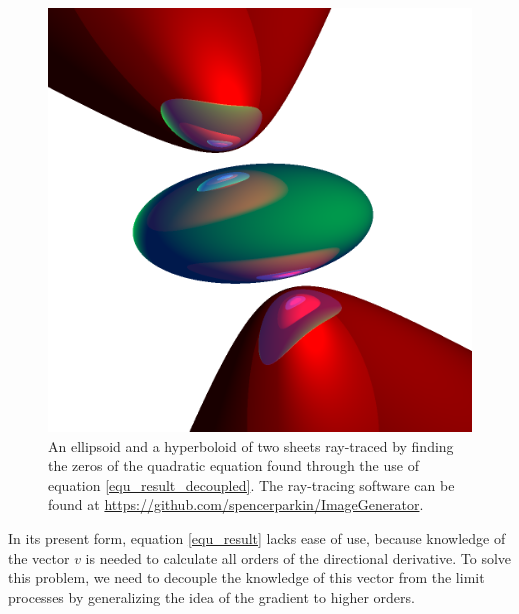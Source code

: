 \documentclass{birkjour}
\theoremstyle{definition}
\theoremstyle{remark}
\numberwithin{equation}{section}
\begin{document}
\begin{figure}
\includegraphics[scale=0.3]{Quadrics}
\caption{An ellipsoid and a hyperboloid of two sheets ray-traced by finding the zeros
of the quadratic equation found through the use of equation \eqref{equ_result_decoupled}.
The ray-tracing software can be found at \url{https://github.com/spencerparkin/ImageGenerator}.}
\label{fig_ray_traced_image}
\end{figure}

In its present form, equation \eqref{equ_result} lacks ease of use, because knowledge of the
vector $v$ is needed to calculate all orders of the directional derivative.  To solve this problem,
we need to decouple the knowledge of this vector from the limit processes by generalizing the
idea of the gradient to higher orders.
\end{document}
